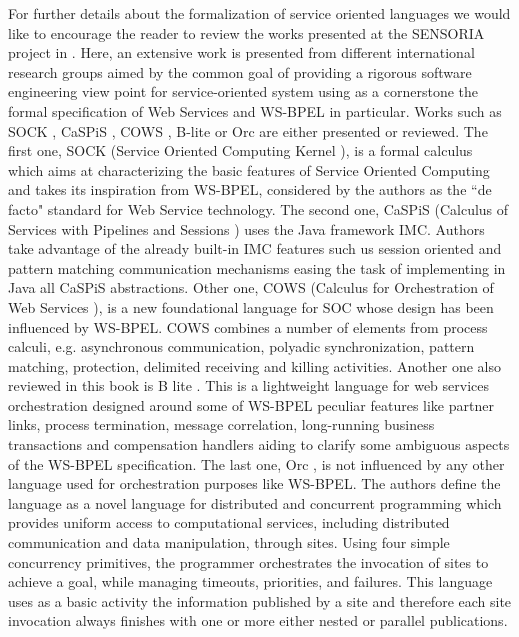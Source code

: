For further details about the formalization of service oriented languages we would like to encourage the reader to review the works presented at the SENSORIA project in \cite{Wirsing2011bis}. Here, an extensive work is presented from different international research groups aimed by the common goal of providing a rigorous software engineering view point for service-oriented system using as a cornerstone the formal specification of Web Services and WS-BPEL in particular. Works such as SOCK \cite{Wirsing2011bis}, CaSPiS \cite{Bettini2008}, COWS \cite{Lapadula2007}, B-lite \cite{Lapadula2008} or Orc \cite{Kitchin2009} are either presented or reviewed. The first one, SOCK (Service Oriented Computing Kernel \cite{Wirsing2011bis}), is a formal calculus which aims at characterizing the basic features of Service Oriented Computing and takes its inspiration from WS-BPEL, considered by the authors as the ``de facto" standard for Web Service technology. The second one, CaSPiS (Calculus of Services with Pipelines and Sessions \cite{Bettini2008}) uses the Java framework IMC. Authors take advantage of the already built-in IMC features such us session oriented and pattern matching communication mechanisms easing the task of implementing in Java all CaSPiS abstractions. Other one, COWS (Calculus for Orchestration of Web Services \cite{Lapadula2007}), is a new foundational language for SOC whose design has been influenced by WS-BPEL. COWS combines a number of elements from process calculi, e.g. asynchronous communication, polyadic synchronization, pattern matching, protection, delimited receiving and killing activities. 
Another one also reviewed in this book is B lite \cite{Lapadula2008}. This is a lightweight language for web services orchestration designed around some of WS-BPEL peculiar features like partner links, process termination, message correlation, long-running business transactions and compensation handlers aiding to clarify some ambiguous aspects of the WS-BPEL specification. The last one, Orc \cite{Kitchin2009}, is not influenced by any other language used for orchestration purposes like WS-BPEL. The authors define the language as a novel language for distributed and concurrent programming which provides uniform access to computational services, including distributed communication and data manipulation, through sites. Using four simple concurrency primitives, the programmer orchestrates the invocation of sites to achieve a goal, while managing timeouts, priorities, and failures. This language uses as a basic activity the information published by a site and therefore each site invocation always finishes with one or more either nested or parallel publications.

